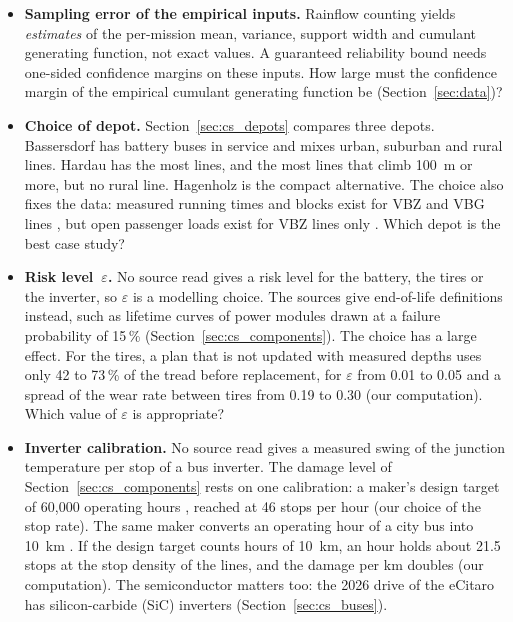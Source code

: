 \documentclass[11pt,a4paper]{article}
\theoremstyle{plain}
\theoremstyle{definition}
\theoremstyle{remark}
\begin{document}
\begin{itemize}
  \item \textbf{Sampling error of the empirical inputs.}
    Rainflow counting yields \emph{estimates} of the per-mission mean, variance, support width and cumulant generating function, not exact values.
    A guaranteed reliability bound needs one-sided confidence margins on these inputs.
    How large must the confidence margin of the empirical cumulant generating function be (Section~\ref{sec:data})?
  \item \textbf{Choice of depot.}\label{sec:cs_open}
    Section~\ref{sec:cs_depots} compares three depots.
    Bassersdorf has battery buses in service and mixes urban, suburban and rural lines.
    Hardau has the most lines, and the most lines that climb 100~m or more, but no rural line.
    Hagenholz is the compact alternative.
    The choice also fixes the data: measured running times and blocks exist for VBZ and VBG lines \cite{VBZSollIst2023,IstDaten2026}, but open passenger loads exist for VBZ lines only \cite{VBZFahrgast2025}.
    Which depot is the best case study?
  \item \textbf{Risk level~$\varepsilon$.}
    No source read gives a risk level for the battery, the tires or the inverter, so $\varepsilon$ is a modelling choice.
    The sources give end-of-life definitions instead, such as lifetime curves of power modules drawn at a failure probability of 15\,\% (Section~\ref{sec:cs_components}).
    The choice has a large effect.
    For the tires, a plan that is not updated with measured depths uses only 42 to 73\,\% of the tread before replacement, for $\varepsilon$ from 0.01 to 0.05 and a spread of the wear rate between tires from 0.19 to 0.30 (our computation).
    Which value of $\varepsilon$ is appropriate?
  \item \textbf{Inverter calibration.}
    No source read gives a measured swing of the junction temperature per stop of a bus inverter.
    The damage level of Section~\ref{sec:cs_components} rests on one calibration: a maker's design target of 60,000 operating hours \cite{Backhaus2019}, reached at 46 stops per hour (our choice of the stop rate).
    The same maker converts an operating hour of a city bus into 10~km \cite{Backhaus2019}.
    If the design target counts hours of 10~km, an hour holds about 21.5 stops at the stop density of the lines, and the damage per km doubles (our computation).
    The semiconductor matters too: the 2026 drive of the eCitaro has silicon-carbide (SiC) inverters (Section~\ref{sec:cs_buses}).

\end{itemize}
\end{document}

